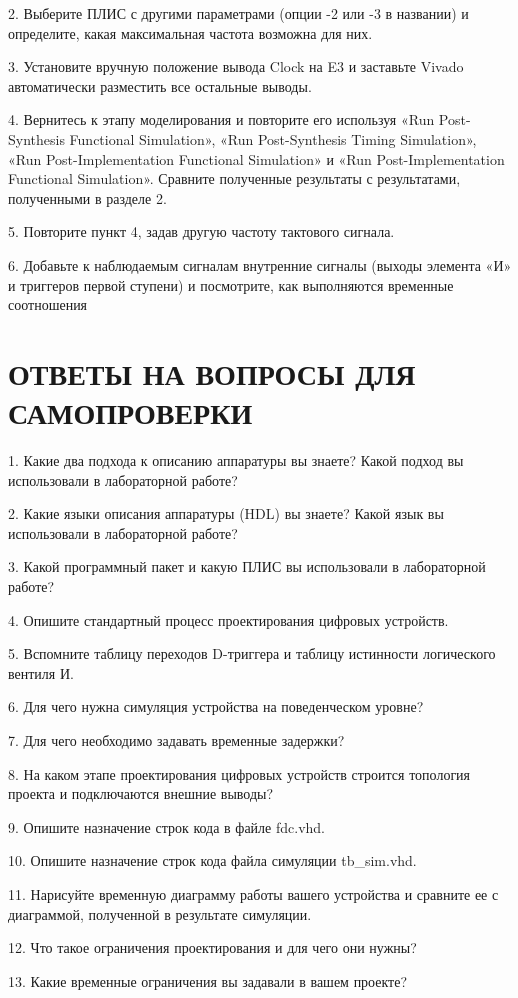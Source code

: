 \begin{sloppypar}
2. Выберите ПЛИС с другими параметрами (опции -2 или -3 в названии) и определите, какая максимальная частота возможна для них.


3. Установите вручную положение вывода Clock на E3 и заставьте Vivado автоматически разместить все остальные выводы.


4. Вернитесь к этапу моделирования и повторите его используя «Run Post-Synthesis Functional Simulation», «Run Post-Synthesis Timing Simulation», «Run Post-Implementation Functional Simulation» и «Run Post-Implementation Functional Simulation». Сравните полученные результаты с результатами, полученными в разделе 2.


5. Повторите пункт 4, задав другую частоту тактового сигнала.


6. Добавьте к наблюдаемым сигналам внутренние сигналы (выходы элемента «И» и триггеров первой ступени) и посмотрите, как выполняются временные соотношения









\section*{ОТВЕТЫ НА ВОПРОСЫ ДЛЯ САМОПРОВЕРКИ}

1. Какие два подхода к описанию аппаратуры вы знаете? Какой подход
вы использовали в лабораторной работе?


2. Какие языки описания аппаратуры (HDL) вы знаете? Какой язык вы
использовали в лабораторной работе?


3. Какой программный пакет и какую ПЛИС вы использовали в лабораторной работе?


4. Опишите стандартный процесс проектирования цифровых устройств.


5. Вспомните таблицу переходов D-триггера и таблицу истинности логического вентиля И.


6. Для чего нужна симуляция устройства на поведенческом уровне?


7. Для чего необходимо задавать временные задержки?


8. На каком этапе проектирования цифровых устройств строится топология проекта и подключаются внешние выводы?


9. Опишите назначение строк кода в файле fdc.vhd.


10. Опишите назначение строк кода файла симуляции tb\_sim.vhd.


11. Нарисуйте временную диаграмму работы вашего устройства и сравните ее с диаграммой, полученной в результате симуляции.


12. Что такое ограничения проектирования и для чего они нужны?


13. Какие временные ограничения вы задавали в вашем проекте?




% 
% 


\end{sloppypar}
